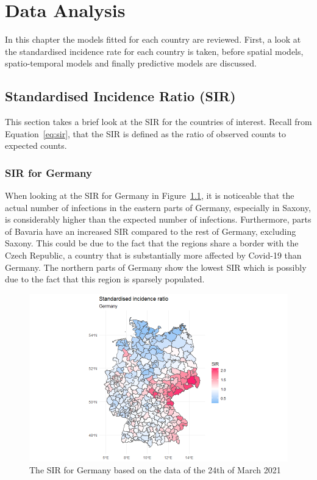 %
\chapter{Data Analysis}
\label{sec:analysis}
In this chapter the models fitted for each country are reviewed. First, a look at the standardised incidence rate for each country is taken, before spatial models, spatio-temporal models and finally predictive models are discussed.
\section{Standardised Incidence Ratio (SIR)}
This section takes a brief look at the SIR for the countries of interest. Recall from Equation~\ref{eq:sir}, that the SIR is defined as the ratio of observed counts to expected counts.
\subsection{SIR for Germany}
When looking at the SIR for Germany in Figure~\ref{sirgermany}, it is noticeable that the actual number of infections in the eastern parts of Germany, especially in Saxony, is considerably higher than the expected number of infections. Furthermore, parts of Bavaria have an increased SIR compared to the rest of Germany, excluding Saxony. This could be due to the fact that the regions share a border with the Czech Republic, a country that is substantially more affected by Covid-19 than Germany. The northern parts of Germany show the lowest SIR which is possibly due to the fact that this region is sparsely populated.
\begin{figure}[H]
 \centering
 \includegraphics[width = 1.2\textwidth]{sir_germany.png}
 \caption{The SIR for Germany based on the data of the 24th of March 2021}
 \label{sirgermany}
\end{figure}
